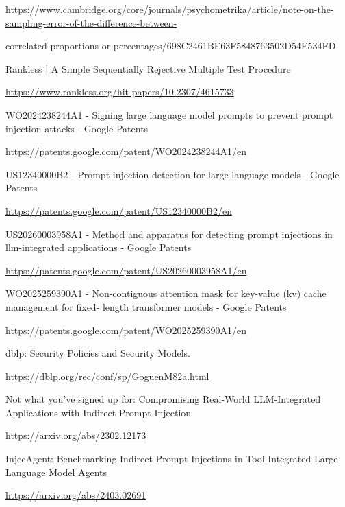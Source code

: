\documentclass[11pt,a4paper]{article}
\begin{document}
\url{https://www.cambridge.org/core/journals/psychometrika/article/note-on-the-sampling-error-of-the-difference-between-}\par
correlated-proportions-or-percentages/698C2461BE63F5848763502D54E534FD\par
Rankless | A Simple Sequentially Rejective Multiple Test Procedure\par
\url{https://www.rankless.org/hit-papers/10.2307/4615733}\par
WO2024238244A1 - Signing large language model prompts to prevent prompt injection attacks - Google Patents\par
\url{https://patents.google.com/patent/WO2024238244A1/en}\par
US12340000B2 - Prompt injection detection for large language models - Google Patents\par
\url{https://patents.google.com/patent/US12340000B2/en}\par
US20260003958A1 - Method and apparatus for detecting prompt injections in llm-integrated applications - Google Patents\par
\url{https://patents.google.com/patent/US20260003958A1/en}\par
WO2025259390A1 - Non-contiguous attention mask for key-value (kv) cache management for fixed- length transformer models - Google Patents\par
\url{https://patents.google.com/patent/WO2025259390A1/en}\par
dblp: Security Policies and Security Models.\par
\url{https://dblp.org/rec/conf/sp/GoguenM82a.html}\par
Not what you've signed up for: Compromising Real-World LLM-Integrated Applications with Indirect Prompt Injection\par
\url{https://arxiv.org/abs/2302.12173}\par
InjecAgent: Benchmarking Indirect Prompt Injections in Tool-Integrated Large Language Model Agents\par
\url{https://arxiv.org/abs/2403.02691}\par
\end{document}

